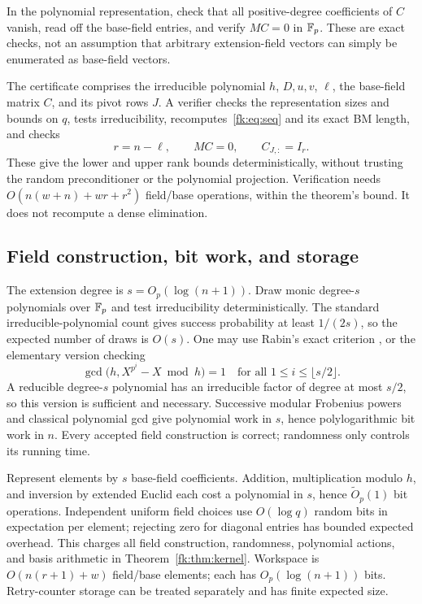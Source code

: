 In the polynomial representation, check that all positive-degree
coefficients of $C$ vanish, read off the base-field entries, and
verify $MC=0$ in $\mathbb F_p$. These are exact checks, not an assumption
that arbitrary extension-field vectors can simply be enumerated as
base-field vectors.

The certificate comprises the irreducible polynomial $h$, $D,u,v$,
$\ell$, the base-field matrix $C$, and its pivot rows $J$.
A verifier checks the representation sizes and bounds on $q$, tests
irreducibility, recomputes~\eqref{fk:eq:seq} and its exact BM length,
and checks
\[
 r=n-\ell,\qquad MC=0,\qquad C_{J,:}=I_r.
\]
These give the lower and upper rank bounds deterministically, without
trusting the random preconditioner or the polynomial projection.
Verification needs $O(n(w+n)+wr+r^2)$ field/base operations, within
the theorem's bound. It does not recompute a dense elimination.

\subsection{Field construction, bit work, and storage}
The extension degree is $s=O_p(\log(n+1))$. Draw monic degree-$s$
polynomials over $\mathbb F_p$ and test irreducibility deterministically.
The standard irreducible-polynomial count gives success probability
at least $1/(2s)$, so the expected number of draws is $O(s)$.
One may use Rabin's exact criterion \cite{Rabin}, or the elementary
version checking
\[
 \gcd\bigl(h,X^{p^i}-X\bmod h\bigr)=1
 \quad\text{for all }1\le i\le\lfloor s/2\rfloor.
\]
A reducible degree-$s$ polynomial has an irreducible factor of degree
at most $s/2$, so this version is sufficient and necessary.
Successive modular Frobenius powers and classical polynomial gcd
give polynomial work in $s$, hence polylogarithmic bit work in $n$.
Every accepted field construction is correct; randomness only
controls its running time.

Represent elements by $s$ base-field coefficients. Addition,
multiplication modulo $h$, and inversion by extended Euclid each
cost a polynomial in $s$, hence $\widetilde O_p(1)$ bit operations.
Independent uniform field choices use $O(\log q)$ random bits in
expectation per element; rejecting zero for diagonal entries has
bounded expected overhead. This charges all field construction,
randomness, polynomial actions, and basis arithmetic in
Theorem~\ref{fk:thm:kernel}. Workspace is $O(n(r+1)+w)$ field/base
elements; each has $O_p(\log(n+1))$ bits. Retry-counter storage can
be treated separately and has finite expected size.

